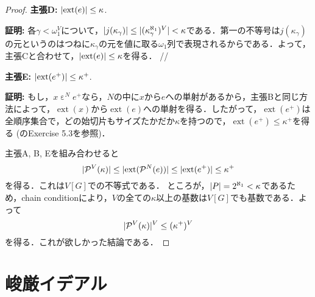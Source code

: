 \documentclass[uplatex]{jsarticle}
\newcommand{\Pow}{\mathcal{P}}
\newcommand{\ext}{\operatorname{ext}}
\DeclarePairedDelimiter\abs{\lvert}{\rvert}
\theoremstyle{definition}
\begin{document}
\begin{proof}
		\par \textbf{主張D: } $\abs{\ext(e)} \le \kappa$.
		\par \textbf{証明: } 各$\gamma < \omega_1^V$について，$\abs{j(\kappa_\gamma)} \le \abs{(\kappa_\gamma^{\aleph_1})^V} < \kappa$である．第一の不等号は$j(\kappa_\gamma)$の元というのはつねに$\kappa_\gamma$の元を値に取る$\omega_1$列で表現されるからである．よって，主張Cと合わせて，$\abs{\ext(e)} \le \kappa$を得る．  \hfill //
		
		\par \textbf{主張E: } $\abs{\ext(e^+)} \le \kappa^+$.
		\par \textbf{証明: } もし，$x \mathrel{\varepsilon}^N e^+$なら，$N$の中に$x$から$e$への単射があるから，主張Bと同じ方法によって，$\ext(x)$から$\ext(e)$への単射を得る．したがって，$\ext(e^+)$は全順序集合で，どの始切片もサイズたかだか$\kappa$を持つので，$\ext(e^+) \le \kappa^+$を得る (\cite{jech2006set}のExercise 5.3を参照)．	
		
		主張A, B, Eを組み合わせると
		\[
			\abs{\Pow^V(\kappa)} \le \abs{\ext(\Pow^N(e))} \le \abs{\ext(e^+)} \le \kappa^+
		\]
		を得る．これは$V[G]$での不等式である．
		ところが，$\abs{P} = 2^{\aleph_1} < \kappa$であるため，chain conditionにより，$V$の全ての$\kappa$以上の基数は$V[G]$でも基数である．よって
		\[
		\abs{\Pow^V(\kappa)}^V \le (\kappa^+)^V
		\]
		を得る．これが欲しかった結論である．
	 \end{proof}
	
	\section{峻厳イデアル}
	
	\nocite{*}
	\printbibliography[title={参考文献}]

	
\end{document}
